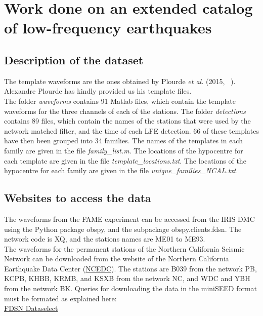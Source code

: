\documentclass[workdone.tex]{subfiles}
\begin{document}
\chapter{Work done on an extended catalog of low-frequency earthquakes}

\section{Description of the dataset}

The template waveforms are the ones obtained by Plourde \textit{et al.} (2015, ~\cite{PLO_2015}). Alexandre Plourde has kindly provided us his template files. \\

The folder \textit{waveforms} contains 91 Matlab files, which contain the template waveforms for the three channels of each of the stations. The folder \textit{detections} contains 89 files, which contain the names of the stations that were used by the network matched filter, and the time of each LFE detection. 66 of these templates have then been grouped into 34 families. The names of the templates in each family are given in the file \textit{family\_list.m}. The locations of the hypocentre for each template are given in the file \textit{template\_locations.txt}. The locations of the hypocentre for each family are given in the file \textit{unique\_families\_NCAL.txt}.

\section{Websites to access the data}

The waveforms from the FAME experiment can be accessed from the IRIS DMC using the Python package obspy, and the subpackage obspy.clients.fdsn. The network code is XQ, and the stations names are ME01 to ME93. \\

The waveforms for the permanent stations of the Northern California Seismic Network can be downloaded from the website of the Northern California Earthquake Data Center (\href{http://ncedc.org/}{NCEDC}). The stations are B039 from the network PB, KCPB, KHBB, KRMB, and KSXB from the network NC, and WDC and YBH from the network BK. Queries for downloading the data in the miniSEED format must be formated as explained here: \\

\href{http://service.ncedc.org/fdsnws/dataselect/1/#description-box}{FDSN Dataselect} \\
\end{document}
